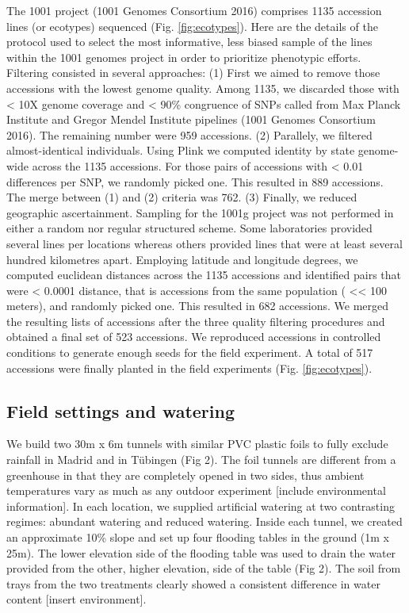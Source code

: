 \documentclass[12pt,]{article}
\begin{document}
The 1001 project (1001 Genomes Consortium 2016) comprises 1135 accession
lines (or ecotypes) sequenced (Fig. \ref{fig:ecotypes}). Here are the
details of the protocol used to select the most informative, less biased
sample of the lines within the 1001 genomes project in order to
prioritize phenotypic efforts. Filtering consisted in several
approaches: (1) First we aimed to remove those accessions with the
lowest genome quality. Among 1135, we discarded those with \textless{}
10X genome coverage and \textless{} 90\% congruence of SNPs called from
Max Planck Institute and Gregor Mendel Institute pipelines (1001 Genomes
Consortium 2016). The remaining number were 959 accessions. (2)
Parallely, we filtered almost-identical individuals. Using Plink we
computed identity by state genome-wide across the 1135 accessions. For
those pairs of accessions with \textless{} 0.01 differences per SNP, we
randomly picked one. This resulted in 889 accessions. The merge between
(1) and (2) criteria was 762. (3) Finally, we reduced geographic
ascertainment. Sampling for the 1001g project was not performed in
either a random nor regular structured scheme. Some laboratories
provided several lines per locations whereas others provided lines that
were at least several hundred kilometres apart. Employing latitude and
longitude degrees, we computed euclidean distances across the 1135
accessions and identified pairs that were \textless{} 0.0001 distance,
that is accessions from the same population ( \textless{}\textless{} 100
meters), and randomly picked one. This resulted in 682 accessions. We
merged the resulting lists of accessions after the three quality
filtering procedures and obtained a final set of 523 accessions. We
reproduced accessions in controlled conditions to generate enough seeds
for the field experiment. A total of 517 accessions were finally planted
in the field experiments (Fig. \ref{fig:ecotypes}).

\subsection{Field settings and
watering}\label{field-settings-and-watering}

We build two 30m x 6m tunnels with similar PVC plastic foils to fully
exclude rainfall in Madrid and in Tübingen (Fig 2). The foil tunnels are
different from a greenhouse in that they are completely opened in two
sides, thus ambient temperatures vary as much as any outdoor experiment
{[}include environmental information{]}. In each location, we supplied
artificial watering at two contrasting regimes: abundant watering and
reduced watering. Inside each tunnel, we created an approximate 10\%
slope and set up four flooding tables in the ground (1m x 25m). The
lower elevation side of the flooding table was used to drain the water
provided from the other, higher elevation, side of the table (Fig 2).
The soil from trays from the two treatments clearly showed a consistent
difference in water content {[}insert environment{]}.
\end{document}
